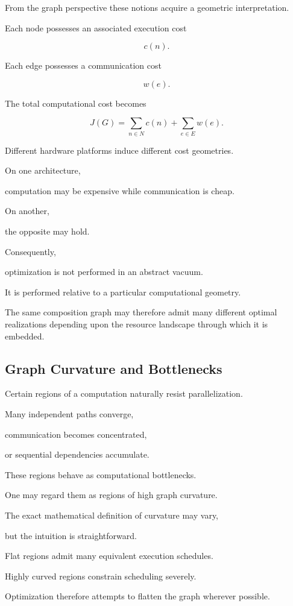 \documentclass[12pt,oneside]{article}
\begin{document}
From the graph perspective these notions acquire a geometric interpretation.

Each node possesses an associated execution cost

\[
c(n).
\]

Each edge possesses a communication cost

\[
w(e).
\]

The total computational cost becomes

\[
J(G)
=
\sum_{n\in N}c(n)
+
\sum_{e\in E}w(e).
\]

Different hardware platforms induce different cost geometries.

On one architecture,

computation may be expensive while communication is cheap.

On another,

the opposite may hold.

Consequently,

optimization is not performed in an abstract vacuum.

It is performed relative to a particular computational geometry.

The same composition graph may therefore admit many different optimal realizations depending upon the resource landscape through which it is embedded.

\subsection{Graph Curvature and Bottlenecks}

Certain regions of a computation naturally resist parallelization.

Many independent paths converge,

communication becomes concentrated,

or sequential dependencies accumulate.

These regions behave as computational bottlenecks.

One may regard them as regions of high graph curvature.

The exact mathematical definition of curvature may vary,

but the intuition is straightforward.

Flat regions admit many equivalent execution schedules.

Highly curved regions constrain scheduling severely.

Optimization therefore attempts to flatten the graph wherever possible.
\end{document}
